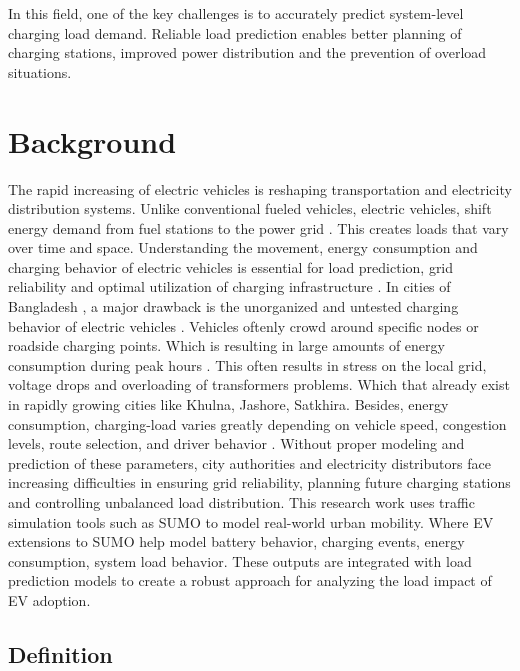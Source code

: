 \documentclass{thesis-library}
\begin{document}
In this field, one of the key challenges is to accurately predict system-level charging load demand. Reliable load prediction enables better planning of charging stations, improved power distribution and the prevention of overload situations.

\section{Background}

The rapid increasing of electric vehicles is reshaping transportation and electricity distribution systems. Unlike conventional fueled vehicles, electric vehicles, shift energy demand from fuel stations to the power grid . This creates loads that vary over time and space. Understanding the movement, energy consumption and charging behavior of electric vehicles is essential for load prediction, grid reliability and optimal utilization of charging infrastructure \cite{regression_ev2020}. In cities of Bangladesh , a major drawback is the unorganized and untested charging behavior of electric vehicles . Vehicles oftenly crowd around specific nodes or roadside charging points. Which is resulting in large amounts of energy consumption during peak hours . This often results in stress on the local grid, voltage drops and overloading of transformers problems. Which that already exist in rapidly growing cities like Khulna, Jashore, Satkhira. Besides, energy consumption, charging-load varies greatly depending on vehicle speed, congestion levels, route selection, and driver behavior . Without proper modeling and prediction of these parameters, city authorities and electricity distributors face increasing difficulties in ensuring grid reliability, planning future charging stations and controlling unbalanced load distribution. This research work uses traffic simulation tools such as SUMO to model real-world urban mobility. Where EV extensions to SUMO help model battery behavior, charging events, energy consumption, system load behavior. These outputs are integrated with load prediction models to create a robust approach for analyzing the load impact of EV adoption.

\subsection{Definition}
\end{document}
